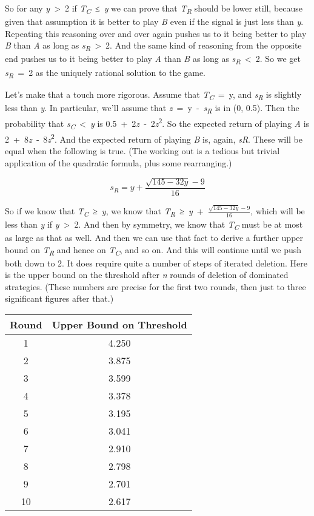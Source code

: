 \documentclass[
  11pt,
]{book}
\begin{document}
So for any \emph{y}~\textgreater~2 if \emph{T\textsubscript{C}}~≤~\emph{y} we can prove that \emph{T\textsubscript{R}} should be lower still, because given that assumption it is better to play \emph{B} even if the signal is just less than \emph{y}. Repeating this reasoning over and over again pushes us to it being better to play \emph{B} than \emph{A} as long as \emph{s\textsubscript{R}}~\textgreater~2. And the same kind of reasoning from the opposite end pushes us to it being better to play \emph{A} than \emph{B} as long as \emph{s\textsubscript{R}}~\textless~2. So we get \emph{s\textsubscript{R}}~=~2 as the uniquely rational solution to the game.

Let's make that a touch more rigorous. Assume that \emph{T\textsubscript{C}}~=~y, and \emph{s\textsubscript{R}} is slightly less than \emph{y}. In particular, we'll assume that \emph{z}~=~y~-~\emph{s\textsubscript{R}} is in (0, 0.5). Then the probability that \emph{s\textsubscript{C}}~\textless~\emph{y} is 0.5~+~2\emph{z}~‑~2\emph{z}\textsuperscript{2}. So the expected return of playing \emph{A} is 2~+~8\emph{z}~‑~8\emph{z}\textsuperscript{2}. And the expected return of playing \emph{B} is, again, \emph{sR}. These will be equal when the following is true. (The working out is a tedious but trivial application of the quadratic formula, plus some rearranging.)

\[
s_R = y + \frac{\sqrt{145-32y}-9}{16}
\]

So if we know that \emph{T\textsubscript{C}}~≥~\emph{y}, we know that \emph{T\textsubscript{R}}~≥~\emph{y}~+~\(\frac{\sqrt{145-32y}-9}{16}\), which will be less than \emph{y} if \emph{y}~\textgreater~2. And then by symmetry, we know that \emph{T\textsubscript{C}} must be at most as large as that as well. And then we can use that fact to derive a further upper bound on \emph{T\textsubscript{R}} and hence on \emph{T\textsubscript{C}}, and so on. And this will continue until we push both down to 2. It does require quite a number of steps of iterated deletion. Here is the upper bound on the threshold after \emph{n} rounds of deletion of dominated strategies. (These numbers are precise for the first two rounds, then just to three significant figures after that.)

\begin{longtable}[]{@{}cc@{}}
\toprule()
Round & Upper Bound on Threshold \\
\midrule()
\endhead
1 & 4.250 \\
2 & 3.875 \\
3 & 3.599 \\
4 & 3.378 \\
5 & 3.195 \\
6 & 3.041 \\
7 & 2.910 \\
8 & 2.798 \\
9 & 2.701 \\
10 & 2.617 \\
\bottomrule()
\end{longtable}
\end{document}
